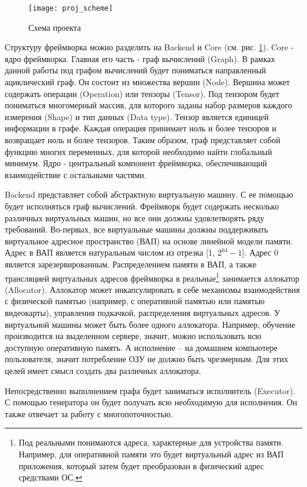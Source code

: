 \begin{figure}[h]
        \centering
        \texttt{[image: proj\_scheme]}
        \caption{Схема проекта}
        \label{task:proj_scheme}
\end{figure}
Структуру фреймворка можно разделить на Backend и Core (см. рис. \ref{task:proj_scheme}). Core - ядро фреймворка. Главная его часть - граф вычислений (Graph). В рамках данной работы под графом вычислений будет пониматься направленный ациклический граф. Он состоит из множества вершин (Node). Вершина может содержать операции (Operation) или тензоры (Tensor). Под тензором будет пониматься многомерный массив, для которого заданы набор размеров каждого измерения (Shape) и тип данных (Data type). Тензор является единицей информации в графе. Каждая операция принимает ноль и более тензоров и возвращает ноль и более тензоров. Таким образом, граф представляет собой функцию многих переменных, для которой необходимо найти глобальный минимум. Ядро - центральный компонент фреймворка, обеспечивающий взаимодействие с остальными частями.
\par
Backend представляет собой абстрактную виртуальную машину. С ее помощью будет исполняться граф вычислений. Фреймворк будет содержать несколько различных виртуальных машин, но все они должны удовлетворять ряду требований. Во-первых, все виртуальные машины должны поддерживать виртуальное адресное пространство (ВАП) на основе линейной модели памяти. Адрес в ВАП является натуральным числом из отрезка [1, $2^{64}-1$]. Адрес 0 является зарезервированным. Распределением памяти в ВАП, а также трансляцией виртуальных адресов фреймворка в реальные\footnote{Под реальными понимаются адреса, характерные для устройства памяти. Например, для оперативной памяти это будет виртуальный адрес из ВАП приложения, который затем будет преобразован в физический адрес средствами ОС.} занимается аллокатор (Allocator). Аллокатор может инкапсулировать в себе механизмы взаимодействия с физической памятью (например, с оперативной памятью или памятью видеокарты), управления подкачкой, распределения виртуальных адресов. У виртуальной машины может быть более одного аллокатора. Например, обучение производится на выделенном сервере, значит, можно использовать всю доступную оперативную память. А исполнение -- на домашнем компьютере пользователя, значит потребление ОЗУ не должно быть чрезмерным. Для этих целей имеет смысл создать два различных аллокатора.
\par
Непосредственно выполнением графа будет заниматься исполнитель (Executor). С помощью генератора он будет получать всю необходимую для исполнения. Он также отвечает за работу с многопоточностью.
